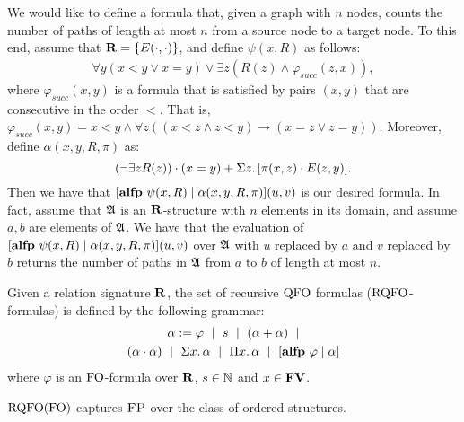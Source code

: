 \begin{example}
We would like to define a formula that, given a graph with $n$ nodes, counts the number of paths of length at most $n$ from a source node to a target node. To this end, assume that $\mathbf{R} = \{ E(\cdot,\cdot) \}$, and define $\psi(x,R)$ as follows:
\begin{eqnarray*}
\forall y(x < y \vee x = y) \vee \exists z(R(z) \wedge \varphi_{succ}(z,x)),
\end{eqnarray*}
where $\varphi_{succ}(x,y)$ is a formula that is satisfied by pairs $(x,y)$ that are consecutive in the order $<$. That is, $\varphi_{succ}(x,y) = x < y \wedge \forall z((x < z \wedge z < y) \to (x = z \vee z = y) )$. Moreover, define $\alpha(x,y,R,\pi)$ as:
$$
(\neg \exists zR(z))\cdot(x = y) + \Sigma{z}.\, [\pi(x,z)\cdot E(z,y)].
$$
Then we have that $[{\bf alfp} \,\,\psi(x,R)\mid \alpha(x,y,R,\pi)](u,v)$ is our desired formula. In fact, assume that $\mathfrak{A}$ is an $\mathbf{R}$-structure with $n$ elements in its domain, and assume $a,b$ are elements of $\mathfrak{A}$. We have that the evaluation of $[{\bf alfp} \,\,\psi(x,R)\mid \alpha(x,y,R,\pi)](u,v)$ over $\mathfrak{A}$ with $u$ replaced by $a$ and $v$ replaced by $b$ returns the number of paths in $\mathfrak{A}$ from $a$ to $b$ of length at most $n$.
\end{example}

Given a relation signature $\mathbf{R}$, the set of recursive ${\rm QFO}$ formulas (${\rm RQFO}$-formulas) is defined by the following grammar:
\begin{multline*}
	\alpha := \varphi \ \mid \ s \ \mid \ (\alpha + \alpha) \ \mid \\ (\alpha \cdot \alpha) \ \mid \ \Sigma{x}.\, \alpha \ \mid \ \Pi{x}.\, \alpha \ \mid \ [{\bf alfp} \,\, \varphi \mid \alpha]
\end{multline*}
where $\varphi$ is an ${\rm FO}$-formula over $\mathbf{R}$, $s \in \mathbb{N}$ and $x \in \mathbf{FV}$.


\begin{theorem} \label{rqfo-fo-cap}
	${\rm RQFO}({\rm FO})$ captures $\text{\sc FP}$ over the class of ordered structures.
\end{theorem}

